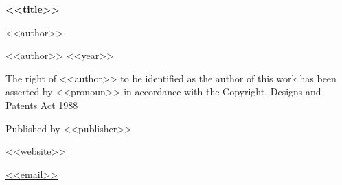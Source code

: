 \begin{blockparagraphs}

\textbf{<<title>>}

<<author>>

\textcopyright{} <<author>> <<year>>

The right of <<author>> to be identified as the author of this work has been asserted by <<pronoun>> in accordance with the Copyright, Designs and Patents Act 1988

Published by <<publisher>>

\url{<<website>>}

\url{<<email>>}

\end{blockparagraphs}
